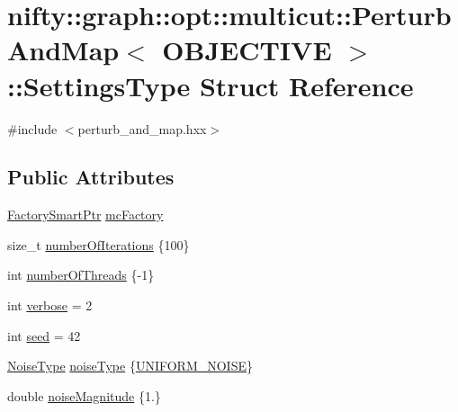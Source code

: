 \hypertarget{structnifty_1_1graph_1_1opt_1_1multicut_1_1PerturbAndMap_1_1SettingsType}{}\section{nifty\+:\+:graph\+:\+:opt\+:\+:multicut\+:\+:Perturb\+And\+Map$<$ O\+B\+J\+E\+C\+T\+I\+VE $>$\+:\+:Settings\+Type Struct Reference}
\label{structnifty_1_1graph_1_1opt_1_1multicut_1_1PerturbAndMap_1_1SettingsType}


{\ttfamily \#include $<$perturb\+\_\+and\+\_\+map.\+hxx$>$}

\subsection*{Public Attributes}
\begin{DoxyCompactItemize}
\item 
\hyperlink{classnifty_1_1graph_1_1opt_1_1multicut_1_1PerturbAndMap_ac2849f0d5d528fb07bf62f213bee8551}{Factory\+Smart\+Ptr} \hyperlink{structnifty_1_1graph_1_1opt_1_1multicut_1_1PerturbAndMap_1_1SettingsType_a9d50ceeee998473e4d84d26246a95999}{mc\+Factory}
\item 
size\+\_\+t \hyperlink{structnifty_1_1graph_1_1opt_1_1multicut_1_1PerturbAndMap_1_1SettingsType_a9af336fc0249c536439c71296e06f49d}{number\+Of\+Iterations} \{100\}
\item 
int \hyperlink{structnifty_1_1graph_1_1opt_1_1multicut_1_1PerturbAndMap_1_1SettingsType_a92e98a0205c971ff0c6200feb4a74a8a}{number\+Of\+Threads} \{-\/1\}
\item 
int \hyperlink{structnifty_1_1graph_1_1opt_1_1multicut_1_1PerturbAndMap_1_1SettingsType_a0ef23d8846a19727453b2d36b4fa9f8b}{verbose} = 2
\item 
int \hyperlink{structnifty_1_1graph_1_1opt_1_1multicut_1_1PerturbAndMap_1_1SettingsType_a3399bb134cd75919663dcbf93eefa6f7}{seed} = 42
\item 
\hyperlink{classnifty_1_1graph_1_1opt_1_1multicut_1_1PerturbAndMap_a4bd929ae1c1786dc7f8bcdf9afd06a36}{Noise\+Type} \hyperlink{structnifty_1_1graph_1_1opt_1_1multicut_1_1PerturbAndMap_1_1SettingsType_aaccbc7c4df1dfbf87d89d85633dc5e6a}{noise\+Type} \{\hyperlink{classnifty_1_1graph_1_1opt_1_1multicut_1_1PerturbAndMap_a4bd929ae1c1786dc7f8bcdf9afd06a36a6dd934268a793988a24fdda02c6f95b7}{U\+N\+I\+F\+O\+R\+M\+\_\+\+N\+O\+I\+SE}\}
\item 
double \hyperlink{structnifty_1_1graph_1_1opt_1_1multicut_1_1PerturbAndMap_1_1SettingsType_a0ed4b2ebf7e48650e5ea3d1431586a3b}{noise\+Magnitude} \{1.\}
\end{DoxyCompactItemize}


